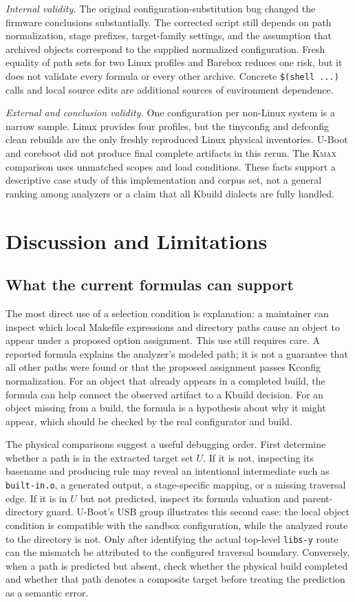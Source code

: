 \documentclass[acmsmall,screen,review]{acmart}
\begin{document}
\emph{Internal validity.} The original configuration-substitution bug changed the firmware conclusions substantially. The corrected script still depends on path normalization, stage prefixes, target-family settings, and the assumption that archived objects correspond to the supplied normalized configuration. Fresh equality of path sets for two Linux profiles and Barebox reduces one risk, but it does not validate every formula or every other archive. Concrete \texttt{\$(shell ...)} calls and local source edits are additional sources of environment dependence.

\emph{External and conclusion validity.} One configuration per non-Linux system is a narrow sample. Linux provides four profiles, but the tinyconfig and defconfig clean rebuilds are the only freshly reproduced Linux physical inventories. U-Boot and coreboot did not produce final complete artifacts in this rerun. The \textsc{Kmax} comparison uses unmatched scopes and load conditions. These facts support a descriptive case study of this implementation and corpus set, not a general ranking among analyzers or a claim that all Kbuild dialects are fully handled.

\section{Discussion and Limitations}
\label{sec:discussion}

\subsection{What the current formulas can support}
The most direct use of a selection condition is explanation: a maintainer can inspect which local Makefile expressions and directory paths cause an object to appear under a proposed option assignment. This use still requires care. A reported formula explains the analyzer's modeled path; it is not a guarantee that all other paths were found or that the proposed assignment passes Kconfig normalization. For an object that already appears in a completed build, the formula can help connect the observed artifact to a Kbuild decision. For an object missing from a build, the formula is a hypothesis about why it might appear, which should be checked by the real configurator and build.

The physical comparisons suggest a useful debugging order. First determine whether a path is in the extracted target set $U$. If it is not, inspecting its basename and producing rule may reveal an intentional intermediate such as \texttt{built-in.o}, a generated output, a stage-specific mapping, or a missing traversal edge. If it is in $U$ but not predicted, inspect its formula valuation and parent-directory guard. U-Boot's USB group illustrates this second case: the local object condition is compatible with the sandbox configuration, while the analyzed route to the directory is not. Only after identifying the actual top-level \texttt{libs-y} route can the mismatch be attributed to the configured traversal boundary. Conversely, when a path is predicted but absent, check whether the physical build completed and whether that path denotes a composite target before treating the prediction as a semantic error.
\end{document}

